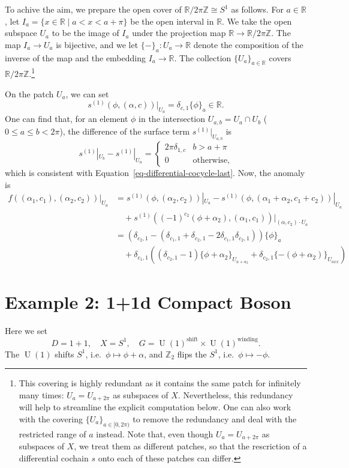 \documentclass[11pt,toc=bibliography]{scrbook}
\DeclareMathOperator{\U}{U}
\numberwithin{equation}{section}
\DeclareMathOperator{\U}{U}
\begin{document}
To achive the aim, we prepare the open cover of
\(\mathbb{R}/2\pi\mathbb{Z}\cong S^1\) as follows. For
\(a \in \mathbb{R}\), let
\(I_a = \{x\in\mathbb{R}\mid a < x < a+\pi \}\) be the open interval in
\(\mathbb{R}\). We take the open subspace \(U_a\) to be the image of
\(I_a\) under the projection map
\(\mathbb{R}\to\mathbb{R}/2\pi\mathbb{Z}\). The map \(I_a \to U_a\) is
bijective, and we let \(\{\mathord{-}\}_a : U_a \to \mathbb{R}\) denote
the composition of the inverse of the map and the embedding
\(I_a \to \mathbb{R}\). The collection \(\{U_a\}_{a\in \mathbb{R}}\)
covers \(\mathbb{R}/2\pi\mathbb{Z}\).\footnote{This covering is highly
  redundant as it contains the same patch for infinitely many times:
  \(U_{a} = U_{a+2\pi}\) as subspaces of \(X\). Nevertheless, this
  redundancy will help to streamline the explicit computation below. One
  can also work with the covering \(\{U_a\}_{a\in [0,2\pi)}\) to remove
  the redundancy and deal with the restricted range of \(a\) instead.
  Note that, even though \(U_a = U_{a+2\pi}\) as subspaces of \(X\), we
  treat them as different patches, so that the rescriction of a
  differential cochain \(s\) onto each of these patches can differ.}

On the patch \(U_a\), we can set \[
s^{(1)}(\phi,(\alpha,c))|_{U_a} = \delta_{c,1} \{\phi\}_a \in \mathbb{R}.
\] One can find that, for an element \(\phi\) in the intersection
\(U_{a,b} = U_a \cap U_b\) (\(0\le a \le b<2\pi\)), the difference of
the surface term \(s^{(1)}|_{U_{a,b}}\) is \[
s^{(1)}|_{U_b} - s^{(1)}|_{U_a} =
\begin{cases}
2\pi \delta_{1,c}& b > a+\pi \\
0 & \text{otherwise},
\end{cases}
\] which is consistent with Equation~\ref{eq-differential-cocycle-last}.
Now, the anomaly is \[
\begin{aligned}
f((\alpha_1,c_1),(\alpha_2,c_2))|_{U_a}
&= s^{(1)}(\phi,(\alpha_2,c_2))|_{U_a}-s^{(1)}(\phi,(\alpha_1+\alpha_2,c_1+c_2))|_{U_a} \\ 
& \quad + s^{(1)}((-1)^{c_2}(\phi+\alpha_2),(\alpha_1,c_1))|_{(\alpha,c_2)\cdot U_a}\\
&= (\delta_{c_2,1} - (\delta_{c_1,1}+\delta_{c_2,1}- 2 \delta_{c_1,1}\delta_{c_2,1}))\{\phi\}_a\\
&\quad  + \delta_{c_1,1} ((\delta_{c_2,1}-1)\{\phi+\alpha_2\}_{U_{a+\alpha_2}}+\delta_{c_2,1}\{-(\phi+\alpha_2)\}_{U_{axx}})
\end{aligned}
\]

\section{Example 2: 1+1d Compact
Boson}\label{sec-equivariant-example-2d}

Here we set \[
D=1+1, \quad X = S^1, \quad G = \U(1)^\text{shift}\times \U(1)^\text{winding}.
\] The \(\U(1)\) shifts \(S^1\), i.e.~\(\phi\mapsto \phi+\alpha\), and
\(\mathbb{Z}_2\) flips the \(S^1\), i.e.~\(\phi\mapsto -\phi\).
\end{document}
